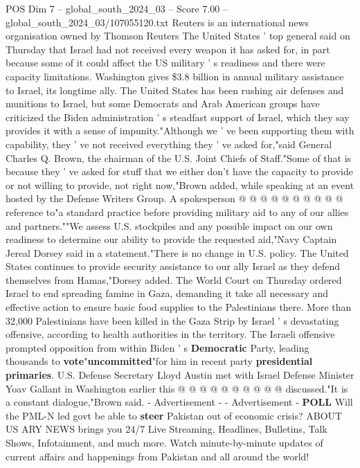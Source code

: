 \begin{textsample}{POS Dim 7 – global\_south\_2024\_03 – Score 7.00 – global\_south\_2024\_03/107055120.txt}  \label{ex:f7_pos_163}
Reuters is an international news organisation owned by Thomson Reuters The United States ' top general said on Thursday that Israel had not received every weapon it has asked for, in part because some of it could affect the US military ' s readiness and there were capacity limitations.
Washington gives \$3.8 billion in annual military assistance to Israel, its longtime ally.
The United States has been rushing air defenses and munitions to Israel, but some Democrats and Arab American groups have criticized the Biden administration ' s steadfast support of Israel, which they say provides it with a sense of impunity."Although we ' ve been supporting them with capability, they ' ve not received everything they ' ve asked for,"said General Charles Q.
Brown, the chairman of the U.S.
Joint Chiefs of Staff."Some of that is because they ' ve asked for stuff that we either don't have the capacity to provide or not willing to provide, not right now,"Brown added, while speaking at an event hosted by the Defense Writers Group.
A spokesperson @ @ @ @ @ @ @ @ @ @ reference to"a standard practice before providing military aid to any of our allies and partners.""We assess U.S. stockpiles and any possible impact on our own readiness to determine our ability to provide the requested aid,"Navy Captain Jereal Dorsey said in a statement."There is no change in U.S. policy.
The United States continues to provide security assistance to our ally Israel as they defend themselves from Hamas,"Dorsey added.
The World Court on Thursday ordered Israel to end spreading famine in Gaza, demanding it take all necessary and effective action to ensure basic food supplies to the Palestinians there.
More than 32,000 Palestinians have been killed in the Gaza Strip by Israel ' s devastating offensive, according to health authorities in the territory.
The Israeli offensive prompted opposition from within Biden ' s \textbf{Democratic} Party, leading thousands to \textbf{vote}"\textbf{uncommitted}"for him in recent party \textbf{presidential} \textbf{primaries}.
U.S.
Defense Secretary Lloyd Austin met with Israel Defense Minister Yoav Gallant in Washington earlier this @ @ @ @ @ @ @ @ @ @ discussed."It is a constant dialogue,"Brown said. - Advertisement - - Advertisement - \textbf{POLL} Will the PML-N led govt be able to \textbf{steer} Pakistan out of economic crisis?
ABOUT US ARY NEWS brings you 24/7 Live Streaming, Headlines, Bulletins, Talk Shows, Infotainment, and much more.
Watch minute-by-minute updates of current affairs and happenings from Pakistan and all around the world!

\end{textsample}
